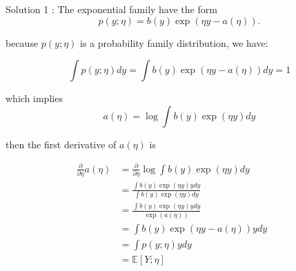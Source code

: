 \begin{answer}

Solution 1 : 
The exponential family have the form 
\begin{equation*}
    p(y ; \eta) = b(y)\exp(\eta y - a(\eta)).
\end{equation*}

because $p(y ; \eta)$ is a probability family distribution, we have: 

\begin{equation*}
\int p(y ; \eta) dy = \int b(y)\exp(\eta y - a(\eta)) dy = 1
\end{equation*}

which implies
\begin{equation*}
    a(\eta) = \log \int b(y)\exp(\eta y) dy
\end{equation*}

then the first derivative of $a(\eta)$ is 

\begin{align*}
    \frac{\partial}{\partial \eta} a(\eta)  &= \frac{\partial}{\partial \eta} \log \int b(y)\exp(\eta y)dy && \text{}\\
     &=\frac{\int b(y)\exp(\eta y) y dy}{ \int b(y)\exp(\eta y) dy}  && \text{}\\
     &=\frac{\int b(y)\exp(\eta y) ydy}{\exp(a(\eta))} \\ 
     &= \int b(y)\exp(\eta y - a(\eta))y dy \\
     &= \int  p(y ; \eta)y dy \\
     &= \mathbb{E}[Y ;\eta] 
\end{align*}

\end{answer}
